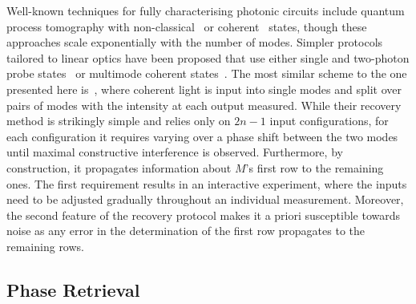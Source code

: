 Well-known techniques for fully characterising photonic circuits include quantum process tomography with non-classical~\cite{OBrien2004} or coherent~\cite{rahimi-keshari_quantum_2011} states, though these approaches scale exponentially with the number of modes.
Simpler protocols tailored to linear optics have been proposed that use either single and two-photon probe states~\cite{laing_super-stable_2012,Dhand2016,Spagnolo2017} or multimode coherent states~\cite{rahimi_direct_2013,Tillmann2016}.
The most similar scheme to the one presented here is~\cite{rahimi_direct_2013}, where coherent light is input into single modes and split over pairs of modes with the intensity at each output measured.
While their recovery method is strikingly simple and relies only on $2n-1$ input configurations, for each configuration it requires varying over a phase shift between the two modes until maximal constructive interference is observed.
Furthermore, by construction, it propagates information about ${M}$'s first row to the remaining ones.
The first requirement results in an interactive experiment, where the inputs need to be adjusted gradually throughout an individual measurement.
Moreover, the second feature of the recovery protocol makes it a priori susceptible towards noise as any error in the determination of the first row propagates to the remaining rows.




\subsection{Phase Retrieval}


